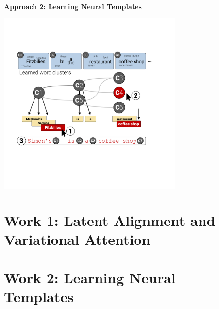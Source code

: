 \documentclass[aspectratio=169]{beamer}
\begin{document}
\begin{frame}
  \begin{center}
    \textbf{Approach 2: Learning Neural Templates}
  \end{center}

  \begin{center}
    \includegraphics[width=0.7\textwidth]{DecoderVis}
  \end{center}
\end{frame}
\section{Work 1: Latent Alignment and Variational Attention}

\section{Work 2: Learning Neural Templates}
{

}
\end{document}

